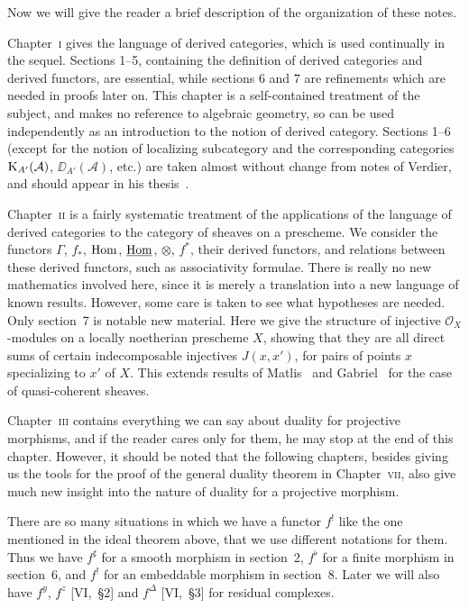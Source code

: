 \bigskip

Now we will give the reader a brief description of the organization of these notes.

Chapter~\textsc{i} gives the language of derived categories, which is used continually in the sequel. Sections 1--5, containing the definition of derived categories and derived functors, are essential, while sections 6 and 7 are refinements which are needed in proofs later on. This chapter is a self-contained treatment of the subject, and makes no reference to algebraic geometry, so can be used independently as an introduction to the notion of derived category. Sections 1--6 (except for the notion of localizing subcategory and the corresponding categories $\operatorname{K}_{A'}(\mathcal{A})$, $\DD_{A'}(\mathcal{A})$, etc.) are taken almost without change from notes of Verdier, and should appear in his thesis~\cite{18}.


Chapter~\textsc{ii} is a fairly systematic treatment of the applications of the language of derived categories to the category of sheaves on a prescheme. We consider the functors $\Gamma$, $f_{*}$, $\operatorname{Hom}$, $\underline{\operatorname{Hom}}$, $\otimes$, $f^{*}$, their derived functors, and relations between these derived functors, such as associativity formulae. There is really no new mathematics involved here, since it is merely a translation into a new language of known results. However, some care is taken to see what hypotheses are needed. Only section~7 is notable new material. Here we give the structure of injective $\mathcal{O}_{X}$-modules on a locally noetherian prescheme $X$, showing that they are all direct sums of certain indecomposable injectives $J(x,x')$, for pairs of points $x$ specializing to $x'$ of $X$. This extends results of Matlis~\cite{13} and Gabriel~\cite{5} for the case of quasi-coherent sheaves.

Chapter~\textsc{iii} contains everything we can say about duality for projective morphisms, and if the reader cares only for them, he may stop at the end of this chapter. However, it should be noted that the following chapters, besides giving us the tools for the proof of the general duality theorem in Chapter~\textsc{vii}, also give much new insight into the nature of duality for a projective morphism.

There are so many situations in which we have a functor $f^{!}$ like the one mentioned in the ideal theorem above, that we use different notations for them. Thus we have $f^{\sharp}$ for a smooth morphism in section~2, $f^{\flat}$ for a finite morphism in section~6, and $f^{!}$ for an embeddable morphism in section~8. Later we will also have $f^{y}$, $f^{z}$ [VI,~\S2] and $f^{\Delta}$ [VI,~\S3] for residual complexes.

